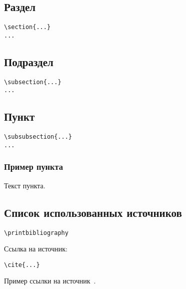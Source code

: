 \documentclass[14pt, a4paper, titlepage]{extarticle}
\renewcommand{\thesection}{\Asbuk{section}}
\let\oldsec\section
\renewcommand{\section}{
        \clearpage
        \phantomsection
        \refstepcounter{section}
        \addcontentsline{toc}{section}{\appendixname~\thesection}
        \oldsec*} %
\let\oldprintbibliography\printbibliography
\renewcommand{\printbibliography}{\oldprintbibliography[title={Список использованных источников}]}
\begin{document}
\subsection{Раздел}

\begin{verbatim}
\section{...}
...
\end{verbatim}

\subsection{Подраздел}

\begin{verbatim}
\subsection{...}
...
\end{verbatim}

\subsection{Пункт}

\begin{verbatim}
\subsubsection{...}
...
\end{verbatim}

\subsubsection{Пример пункта}

Текст пункта.

\subsection{Список использованных источников}

\begin{verbatim}
\printbibliography
\end{verbatim}

Ссылка на источник:
\begin{verbatim}
\cite{...}
\end{verbatim}

Пример ссылки на источник~\cite{bib:gostnir}.
\end{document}
